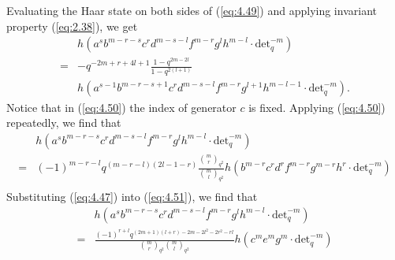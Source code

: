 \documentclass[table,a4paper,reqno]{amsart}
\numberwithin{equation}{section}
\theoremstyle{definition}
\begin{document}
Evaluating the Haar state on both sides of (\ref{eq:4.49}) and applying invariant property (\ref{eq:2.38}), we get
\begin{equation}\label{eq:4.50}
    \begin{split}
        &h\left(a^{s}b^{m-r-s}c^{r}d^{m-s-l}f^{m-r}g^{l}h^{m-l}\cdot\text{det}_q^{-m}\right)\\
        =&-q^{-2m+r+4l+1}\frac{1-q^{2m-2l}}{1-q^{2(l+1)}}\\
        &h\left(a^{s-1}b^{m-r-s+1}c^{r}d^{m-s-l}f^{m-r}g^{l+1}h^{m-l-1}\cdot\text{det}_q^{-m}\right).
    \end{split}
\end{equation}
Notice that in (\ref{eq:4.50}) the index of generator $c$ is fixed. Applying (\ref{eq:4.50}) repeatedly, we find that
\begin{equation}\label{eq:4.51}
    \begin{split}
        &h\left(a^{s}b^{m-r-s}c^{r}d^{m-s-l}f^{m-r}g^{l}h^{m-l}\cdot\text{det}_q^{-m}\right)\\
        =&(-1)^{m-r-l}q^{(m-r-l)(2l-1-r)}\frac{{m\choose r}_{q^2}}{{m\choose l}_{q^2}}h\left(b^{m-r}c^{r}d^{r}f^{m-r}g^{m-r}h^{r}\cdot\text{det}_q^{-m}\right)\\
    \end{split}
\end{equation}
Substituting (\ref{eq:4.47}) into (\ref{eq:4.51}), we find that
\begin{equation}\label{eq:4.52}
    \begin{split}
        &h\left(a^{s}b^{m-r-s}c^{r}d^{m-s-l}f^{m-r}g^{l}h^{m-l}\cdot\text{det}_q^{-m}\right)\\
        =&\frac{(-1)^{r+l}q^{(2m+1)(l+r)-2m-2l^2-2r^2-rl}}{{m\choose r}_{q^2}{m\choose l}_{q^2}}h\left(c^me^mg^m\cdot\text{det}_q^{-m}\right)
    \end{split}
\end{equation}
\end{document}
